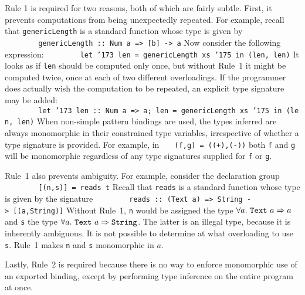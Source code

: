 %
Rule 1 is required for two reasons, both of which are fairly subtle.
First, it prevents computations from being unexpectedly repeated.
For example, recall that \mbox{\tt genericLength} is a standard function whose
type is given by
\bprog
\mbox{\tt \ \ \ \ \ \ \ \ genericLength\ ::\ Num\ a\ =>\ [b]\ ->\ a}
\eprog
Now consider the following expression:
\bprog
\mbox{\tt \ \ \ \ \ \ \ \ let\ {\char'173}\ len\ =\ genericLength\ xs\ {\char'175}\ in\ (len,\ len)}
\eprog
It looks as if \mbox{\tt len} should be computed only once, but without Rule~1 it might
be computed twice, once at each of two different overloadings.  If the 
programmer does actually wish the computation to be repeated, an explicit
type signature may be added:
\bprog
\mbox{\tt \ \ \ \ \ \ \ \ let\ {\char'173}\ len\ ::\ Num\ a\ =>\ a;\ len\ =\ genericLength\ xs\ {\char'175}\ in\ (len,\ len)}
\eprog
When non-simple pattern bindings are used, the types inferred are 
always monomorphic in their constrained type variables, irrespective of whether
a type signature is provided.  For example, in
\bprog
\mbox{\tt \ \ \ (f,g)\ =\ ((+),(-))}
\eprog
both \mbox{\tt f} and \mbox{\tt g} will be monomorphic regardless of any type
signatures supplied for \mbox{\tt f} or \mbox{\tt g}.

Rule~1 also prevents ambiguity.  For example, consider the declaration
group
\bprog
\mbox{\tt \ \ \ \ \ \ \ \ [(n,s)]\ =\ reads\ t}
\eprog
Recall that \mbox{\tt reads} is a standard function whose type is given by the
signature
\bprog
\mbox{\tt \ \ \ \ \ \ \ \ reads\ ::\ (Text\ a)\ =>\ String\ ->\ [(a,String)]}
\eprog
Without Rule~1, \mbox{\tt n} would be assigned the 
type $\forall a.~\mbox{\tt Text}~a \Rightarrow a$ 
and \mbox{\tt s} the type $\forall a.~\mbox{\tt Text}~a \Rightarrow \mbox{\tt String}$.
The latter is an illegal type, because it is inherently ambiguous.
It is not possible to determine at what overloading to use \mbox{\tt s}.
Rule~1 makes \mbox{\tt n} and \mbox{\tt s} monomorphic in $a$.

Lastly, Rule~2 is required because there is no way to enforce monomorphic use
of an exported binding, except by performing type inference on the entire
program at once.

